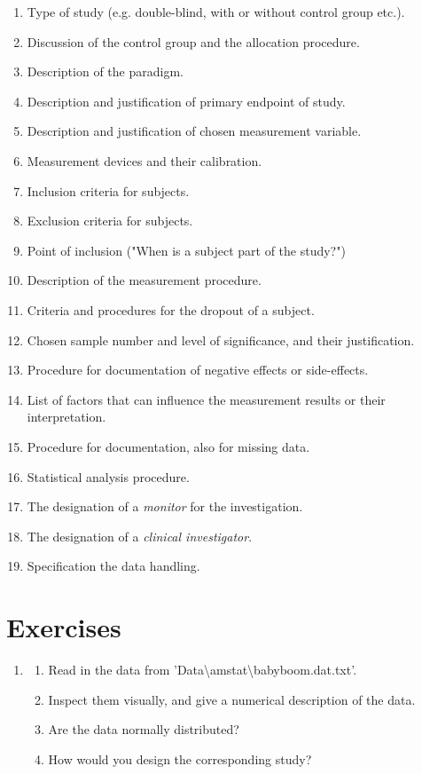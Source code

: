\begin{enumerate}
  \item Type of study (e.g. double-blind, with or without control group etc.).
  \item Discussion of the control group and the allocation procedure.
  \item Description of the paradigm.
  \item Description and justification of primary endpoint of study.
  \item Description and justification of chosen measurement variable.
  \item Measurement devices and their calibration.
  \item Inclusion criteria for subjects.
  \item Exclusion criteria for subjects.
  \item Point of inclusion ("When is a subject part of the study?")
  \item Description of the measurement procedure.
  \item Criteria and procedures for the dropout of a subject.
  \item Chosen sample number and level of significance, and their justification.
  \item Procedure for documentation of negative effects or side-effects.
  \item List of factors that can influence the measurement results or their interpretation.
  \item Procedure for documentation, also for missing data.
  \item Statistical analysis procedure.
  \item The designation of a \emph{monitor} for the investigation.
  \item The designation of a \emph{clinical investigator}.
  \item Specification the data handling.
\end{enumerate}

\section{Exercises}

\begin{enumerate}
  \item
  \begin{enumerate}
    \item Read in the data from 'Data\textbackslash amstat\textbackslash babyboom.dat.txt'.
    \item Inspect them visually, and give a numerical description of the data.
    \item Are the data normally distributed?
    \item How would you design the corresponding study?
  \end{enumerate}

\end{enumerate}


